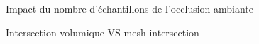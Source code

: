 \begin{figure}[h!]

	\caption{Impact du nombre d'échantillons de l'occlusion ambiante}
\end{figure}
\FloatBarrier

\begin{figure}[h!]

	\caption{Intersection volumique VS mesh intersection}
\end{figure}
\FloatBarrier
